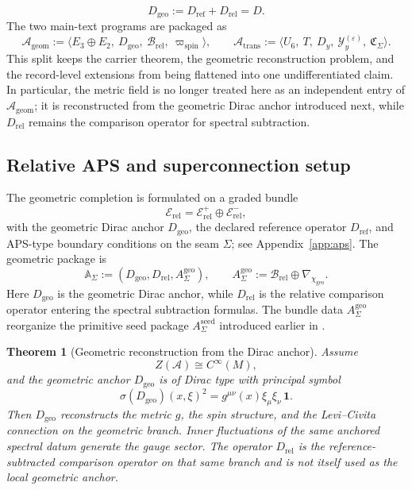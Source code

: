 \documentclass[11pt,a4paper]{article}
\newtheorem{theorem}{Theorem}[section]
\theoremstyle{definition}
\theoremstyle{remark}
\newcommand{\Seam}{\Sigma}
\newcommand{\Ageom}{\mathcal A_{\mathrm{geom}}}
\newcommand{\Atrans}{\mathcal A_{\mathrm{trans}}}
\newcommand{\chigeo}{\chi_{\mathrm{geo}}}
\newcommand{\Ccyc}{\mathfrak C_{\Sigma}}
\newcommand{\wspin}{\varpi_{\mathrm{spin}}}
\begin{document}
\[
D_{\mathrm{geo}}:=D_{\mathrm{ref}}+D_{\mathrm{rel}}=D.
\]
The two main-text programs are packaged as
\[
\Ageom
:=
\langle E_3\oplus E_2,\ D_{\mathrm{geo}},\ \mathcal B_{\mathrm{rel}},\ \wspin\rangle,
\qquad
\Atrans
:=
\langle U_6,\ T,\ D_y,\ \mathcal Y_y^{(\varepsilon)},\ \Ccyc\rangle.
\]
This split keeps the carrier theorem, the geometric reconstruction problem, and the record-level extensions from being flattened into one undifferentiated claim. In particular, the metric field is no longer treated here as an independent entry of $\Ageom$; it is reconstructed from the geometric Dirac anchor introduced next, while $D_{\mathrm{rel}}$ remains the comparison operator for spectral subtraction.

\subsection{Relative APS and superconnection setup}

The geometric completion is formulated on a graded bundle
\[
\mathcal E_{\mathrm{rel}}=\mathcal E_{\mathrm{rel}}^+\oplus\mathcal E_{\mathrm{rel}}^-,
\]
with the geometric Dirac anchor $D_{\mathrm{geo}}$, the declared reference operator
$D_{\mathrm{ref}}$, and APS-type boundary conditions on the seam $\Seam$; see
Appendix~\ref{app:aps}. The geometric package is
\[
\mathbb A_{\Seam}:=(D_{\mathrm{geo}},D_{\mathrm{rel}},A_{\Sigma}^{\mathrm{geo}}),
\qquad
A_{\Sigma}^{\mathrm{geo}}:=\mathcal B_{\mathrm{rel}}\oplus\nabla_{\chigeo}.
\]
Here $D_{\mathrm{geo}}$ is the geometric Dirac anchor, while $D_{\mathrm{rel}}$ is the relative comparison operator entering the spectral subtraction formulas. The bundle data $A_{\Sigma}^{\mathrm{geo}}$ reorganize the primitive seed package $A_{\Sigma}^{\mathrm{seed}}$ introduced earlier in .
\begin{theorem}[Geometric reconstruction from the Dirac anchor]
\label{thm:geometric-reconstruction-anchor}
\label{thm:geometric-reconstruction-from-Dgeo}
\label{thm:relative-geometric-reconstruction}
Assume
\[
Z(\mathcal A)\cong C^\infty(M),
\]
and the geometric anchor $D_{\mathrm{geo}}$ is of Dirac type with principal symbol
\[
\sigma(D_{\mathrm{geo}})(x,\xi)^2
=
g^{\mu\nu}(x)\xi_\mu\xi_\nu\,\mathbf 1.
\]
Then $D_{\mathrm{geo}}$ reconstructs the metric $g$, the spin structure, and the
Levi--Civita connection on the geometric branch. Inner fluctuations of the same anchored
spectral datum generate the gauge sector.
The operator $D_{\mathrm{rel}}$ is the reference-subtracted comparison operator on that
same branch and is not itself used as the local geometric anchor.
\end{theorem}
\end{document}
